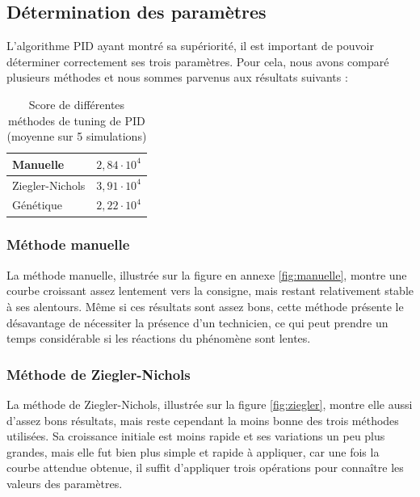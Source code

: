 \documentclass[a4paper,10pt]{report}
\begin{document}
\subsection{Détermination des paramètres}
L'algorithme PID ayant montré sa supériorité, il est important de pouvoir déterminer correctement ses trois paramètres.
Pour cela, nous avons comparé plusieurs méthodes et nous sommes parvenus aux résultats suivants :

\begin{table}[H]
\begin{center}
    \begin{tabular}{|l|l|}
        \hline
        Manuelle & $2,84 \cdot 10^4$ \\ \hline
        Ziegler-Nichols & $3,91 \cdot 10^4$ \\ \hline
        Génétique        & $2,22 \cdot 10^4$ \\ \hline
    \end{tabular}
\end{center}
\caption{Score de différentes méthodes de tuning de PID (moyenne sur 5 simulations)}

\end{table}

\subsubsection{Méthode manuelle}

La méthode manuelle, illustrée sur la figure en annexe \ref{fig:manuelle}, montre une courbe croissant assez lentement vers la consigne, mais restant relativement stable à ses alentours. Même si ces résultats sont assez bons, cette méthode présente le désavantage de nécessiter la présence d'un technicien, ce qui peut prendre un temps considérable si les réactions du phénomène sont lentes.

\subsubsection{Méthode de Ziegler-Nichols}

La méthode de Ziegler-Nichols, illustrée sur la figure \ref{fig:ziegler}, montre elle aussi d'assez bons résultats, mais reste cependant la moins bonne des trois méthodes utilisées.
Sa croissance initiale est moins rapide et ses variations un peu plus grandes, mais elle fut bien plus simple et rapide à appliquer, car une fois la courbe attendue obtenue, il suffit d'appliquer trois opérations pour connaître les valeurs des paramètres.
\end{document}
